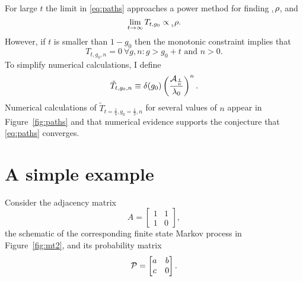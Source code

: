 \documentclass[12pt]{article} \usepackage{amsmath,amsfonts}
\newcommand{\T}{{\cal P}}
\newcommand{\Aop}{{\cal A}}
\newcommand{\leftfunction}{{_{_{\scalebox{.4}{L}}} \rho}}
\begin{document}
For large $t$ the limit in \eqref{eq:paths} approaches a power method for
finding $\leftfunction$, and
\begin{equation*}
  \lim_{t \rightarrow \infty} T_{t,g_0} \propto \leftfunction.
\end{equation*}
However, if $t$ is smaller than $1 - g_0$ then the monotonic
constraint implies that
\begin{equation*}
  T_{t,g_0,n} = 0 ~\forall g,n: g > g_0 + t \text{ and } n > 0.
\end{equation*}
To simplify numerical calculations, I define
\begin{equation*}
  \tilde T_{t,g_0,n} \equiv \delta(g_0) \left( \frac{\Aop_{\frac{t}{n}}}
                {\lambda_0} \right)^n.
\end{equation*}
Numerical calculations of $\tilde T_{t=\frac{1}{4},g_0=\frac{1}{2},n}$
for several values of $n$ appear in Figure~\ref{fig:paths} and that
numerical evidence supports the conjecture that \eqref{eq:paths}
converges.
\begin{figure*}
  \centering
  \caption{These plots of $\tilde T_{t=\frac{1}{4},g_0=\frac{1}{2},n}$
    for several values of $n$, suggest that $\lim_{n \rightarrow
      \infty}$ exists.}
  \label{fig:paths}
\end{figure*}


\newpage
\section{A simple example}
\label{sec:example}

Consider the adjacency matrix
\begin{equation}
  \label{eq:A}
  A = \begin{bmatrix} 1 & 1 \\ 1 & 0 \end{bmatrix},
\end{equation}
the schematic of the corresponding finite state Markov process in
Figure~\ref{fig:mt2}, and its probability matrix
\begin{equation}
  \label{eq:T}
  \T = \begin{bmatrix} a & b \\ c & 0 \end{bmatrix}.
\end{equation}

\begin{figure*}
  \centering
  \resizebox{0.4\textwidth}{!}{ }
  \caption{A schematic of the finite state Markov process specified by
  Equation~\eqref{eq:T}.}
  \label{fig:mt2}
\end{figure*}
\end{document}
